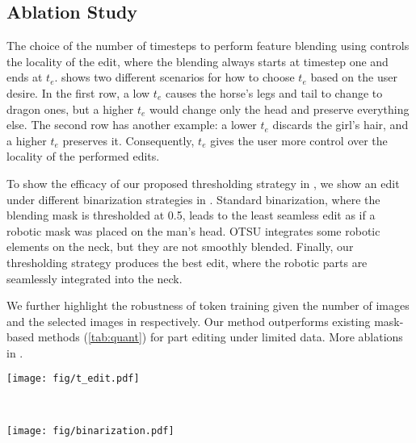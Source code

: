 \subsection{Ablation Study}\label{sec:abl}

The choice of the number of timesteps to perform feature blending using  controls the locality of the edit, where the blending always starts at timestep one and ends at $t_e$.
 shows two different scenarios for how to choose $t_e$ based on the user desire. 
In the first row, a low $t_e$ causes the horse's legs and tail to change to dragon ones, but a higher $t_e$ would change only the head and preserve everything else.
The second row has another example: a lower $t_e$ discards the girl's hair, and a higher $t_e$ preserves it.
Consequently, $t_e$ gives the user more control over the locality of the performed edits.



To show the efficacy of our proposed thresholding strategy in , we show an edit under different binarization strategies in .
Standard binarization, where the blending mask is thresholded at 0.5, leads to the least seamless edit as if a robotic mask was placed on the man's head.
OTSU integrates some robotic elements on the neck, but they are not smoothly blended.
Finally, our thresholding strategy produces the best edit, where the robotic parts are seamlessly integrated into the neck.

 We further highlight the robustness of token training given the number of images and the selected images in  respectively. Our method outperforms existing mask-based methods (\cref{tab:quant}) for part editing under limited data. More ablations in . 




\begin{figure*}
\centering
\begin{minipage}{.55\textwidth}
  \centering
  \texttt{[image: fig/t\_edit.pdf]}
  \label{fig:te}
\end{minipage}%
\begin{minipage}{.01\textwidth}
\
\end{minipage}%
\begin{minipage}{.45\textwidth}
  \centering
  \texttt{[image: fig/binarization.pdf]}
  \label{fig:binary}
\end{minipage}
\end{figure*}


